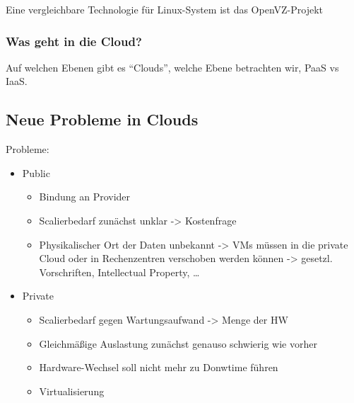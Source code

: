Eine vergleichbare Technologie für Linux-System ist das OpenVZ-Projekt~\cite{ahmed2008server}


\subsubsection{Was geht in die Cloud?}
Auf welchen Ebenen gibt es "`Clouds"', welche Ebene betrachten wir,
PaaS vs IaaS.

\subsection{Neue Probleme in Clouds}
Probleme:
\begin{itemize}
\item Public
  \begin{itemize}
  \item Bindung an Provider
  \item Scalierbedarf zunächst unklar -> Kostenfrage
  \item Physikalischer Ort der Daten unbekannt -> VMs müssen in die
    private Cloud oder in Rechenzentren verschoben werden können ->
    gesetzl. Vorschriften, Intellectual Property, \ldots
  \end{itemize}
\item Private
  \begin{itemize}
  \item Scalierbedarf gegen Wartungsaufwand -> Menge der HW
  \item Gleichmäßige Auslastung zunächst genauso schwierig wie vorher
  \item Hardware-Wechsel soll nicht mehr zu Donwtime führen
  \item Virtualisierung 
  \end{itemize}
\end{itemize}

